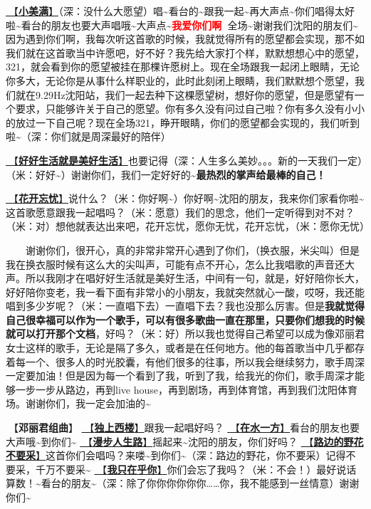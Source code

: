 \documentclass[]{ctexbook}
\begin{document}
\hyperref[happy-ending]{🎵【\textbf{小美满}】}（深：没什么大愿望）唱\textasciitilde 看台的\textasciitilde 跟我一起\textasciitilde 再大声点\textasciitilde 你们唱得太好啦\textasciitilde 看台的朋友也要大声唱哦\textasciitilde 大声点\textasciitilde{}\textbf{\textcolor{red}{我爱你们啊~}}全场\textasciitilde 谢谢我们沈阳的朋友们\textasciitilde 因为遇到你们啊，我每次听这首歌的时候，我就觉得所有的愿望都会实现，那不如我们就在这首歌当中许愿吧，好不好？我先给大家打个样，默默想想心中的愿望，321，就会看到你的愿望被挂在那棵许愿树上。现在全场跟我一起闭上眼睛，无论你多大，无论你是从事什么样职业的，此时此刻闭上眼睛，我们默默想个愿望，我们就在9.29Hz沈阳站，我们一起去种下这棵愿望树，想好你的愿望，但是愿望有一个要求，只能够许关于自己的愿望。你有多久没有问过自己啦？你有多久没有小小的放过一下自己呢？现在全场321，睁开眼睛，你们的愿望都会实现的，我们听到啦\textasciitilde（深：你们就是周深最好的陪伴）

\hyperref[live-happy-life-happy]{🎵【\textbf{好好生活就是美好生活}】}也要记得（深：人生多么美妙。。。新的一天我们一定）（米：好好\textasciitilde）谢谢你们，我们一定好好的\textasciitilde{}\textbf{最热烈的掌声给最棒的自己！}

\hyperref[no-worries]{🎵【\textbf{花开忘忧}】}说什么？（米：你好啊\textasciitilde）你好啊\textasciitilde 沈阳的朋友，我来你们家看你啦\textasciitilde 这首歌愿意跟我一起唱吗？（米：愿意）我们的思念，他们一定听得到对不对？（米：对）想他就表达出来吧，花开忘忧，愿你无忧，花开忘忧，（米：愿你无忧）

  谢谢你们，很开心，真的非常非常开心遇到了你们，（换衣服，米尖叫）但是我在换衣服时候有这么大的尖叫声，可能有点不开心，怎么比我唱歌的声音还大声。所以我刚才在唱好好生活就是美好生活，中间有一句，就是，好好陪你长大，好好陪你变老，我一看下面有非常小的小朋友，我就突然就心一酸，哎呀，我还能唱到多少岁呢？（米：一直唱下去）一直唱下去？我也没那么厉害。但是\textbf{我就觉得自己很幸福可以作为一个歌手，可以有很多歌曲一直在那里，只要你们想我的时候就可以打开那个文档}，好吗？（米：好）所以我也觉得自己希望可以成为像邓丽君女士这样的歌手，无论是隔了多久，或者是在任何地方。他的每首歌当中几乎都存着每一个、很多人的时光胶囊，有他们很多的往事，所以我会继续努力，歌手周深一定要加油！但是因为每一个看到了我，听到了我，给我光的你们，歌手周深才能够一步一步从路边，再到live house，再到剧场，再到体育馆，再到我们沈阳体育场。谢谢你们，我一定会加油的\textasciitilde{}

🎵【\textbf{邓丽君组曲}】
\hyperref[one-in-the-building]{🎵【\textbf{独上西楼}】}跟我一起唱好吗？
\hyperref[on-the-water-side]{🎵【\textbf{在水一方}】}看台的朋友也要大声哦\textasciitilde 到你们\textasciitilde{}
\hyperref[walk-the-road-of-life]{🎵【\textbf{漫步人生路}】}摇起来\textasciitilde 沈阳的朋友，你们好吗？
\hyperref[only-with-me]{🎵【\textbf{路边的野花不要采}】}这首你们会唱吗？来喽\textasciitilde 到你们\textasciitilde（深：路边的野花，你不要采）记得不要采，千万不要采\textasciitilde{}
\hyperref[only-you]{🎵【\textbf{我只在乎你}】}你们会忘了我吗？（米：不会！）最好说话算数！\textasciitilde 看台的朋友\textasciitilde（深：除了你你你你你你\ldots\ldots 你，我不能感到一丝情意）谢谢你们\textasciitilde{}
\end{document}
